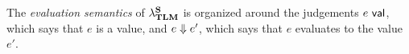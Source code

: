 \documentclass[acmsmall,review,anonymous]{acmart}\settopmatter{printfolios=true,printccs=false,printacmref=false}
\begin{document}


The \emph{evaluation semantics} of $\mathsf{\lambda}_\textbf{TLM}^\textbf{S}$ is organized around the judgements $e~\mathsf{val}$, which says that $e$ is a value, and $e \Downarrow e'$, which says that $e$ evaluates to the value $e'$.%
\end{document}
